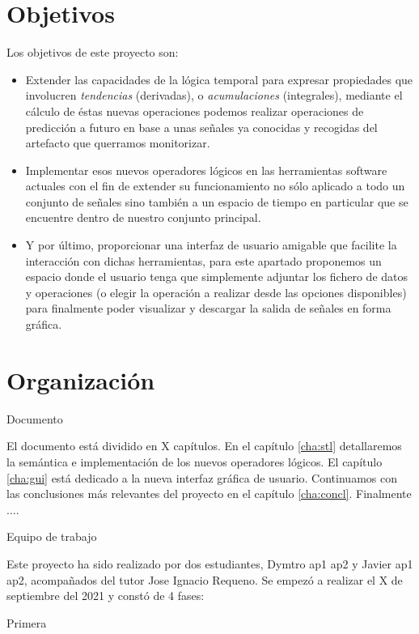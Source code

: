 \section{Objetivos}

Los objetivos de este proyecto son:

\begin{itemize}
\item Extender las capacidades de la lógica temporal para expresar propiedades que involucren \textit{tendencias} (derivadas), o \textit{acumulaciones} (integrales), mediante el cálculo de éstas nuevas operaciones podemos realizar operaciones de predicción a futuro en base a unas señales ya conocidas y recogidas del artefacto que querramos monitorizar.   
\item Implementar esos nuevos operadores lógicos en las herramientas software actuales con el fin de extender su funcionamiento no sólo aplicado a todo un conjunto de señales sino también a un espacio de tiempo en particular que se encuentre dentro de nuestro conjunto principal. 
\item Y por último, proporcionar una interfaz de usuario amigable que facilite la interacción con dichas herramientas, para este apartado  proponemos un espacio donde el usuario tenga que simplemente adjuntar los fichero de datos y operaciones (o elegir la operación a realizar desde las opciones disponibles) para finalmente poder visualizar y descargar la salida de señales en forma gráfica. 
\end{itemize}

\section{Organización}

Documento

El documento está dividido en X capítulos. En el capítulo \ref{cha:stl} detallaremos la semántica e implementación de los nuevos operadores lógicos. El capítulo \ref{cha:gui} está dedicado a la nueva interfaz gráfica de usuario. Continuamos con las conclusiones más relevantes del proyecto en el capítulo \ref{cha:concl}. Finalmente $\ldots$.

Equipo de trabajo 

Este proyecto ha sido realizado por dos estudiantes, Dymtro ap1 ap2 y Javier ap1 ap2, acompañados del tutor Jose Ignacio Requeno. Se empezó a realizar el X de septiembre del 2021 y constó de 4 fases: 

Primera 

